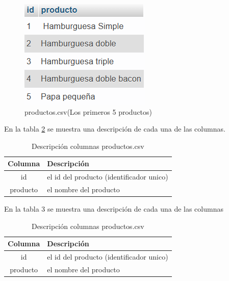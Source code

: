 \begin{figure}[H]
  \begin{center}
    \includegraphics[scale=0.90]{./primeros_5productos.png}
    \caption{productos.csv(Los primeros 5 productos)}
    \label{fig:priemeros_5productos}
  \end{center}
\end{figure}

En la tabla \ref{tab:productos} se muestra una descripción de cada una de las columnas.

\begin{table}

  \begin{tabular}{|c|l|}  %
    \hline
    \rowcolor{cyan!30} \textbf{Columna} & \textbf{Descripción} \\
    \hline
    id &  el id del producto (identificador unico)\\
    producto & el nombre del producto \\
    \hline
  \end{tabular}
  \centering
  \caption{ Descripción columnas productos.csv}
  \label{tab:productos} %
\end{table}

En la tabla 3 se muestra una descripción de cada una de las columnas

\begin{table}

  \begin{tabular}{|c|l|}  %
    \hline
    \rowcolor{cyan!30} \textbf{Columna} & \textbf{Descripción} \\
    \hline
    id &  el id del producto (identificador unico)\\
    producto & el nombre del producto \\
    \hline
  \end{tabular}
  \centering
  \caption{ Descripción columnas productos.csv}
  \label{tab:productos} %
\end{table}


